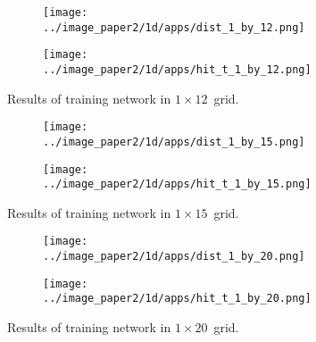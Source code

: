 {    \begin{figure}
        \begin{subfigure}[b]{0.5\textwidth}
            \centering
            \texttt{[image: ../image\_paper2/1d/apps/dist\_1\_by\_12.png]}
        \end{subfigure}
        \hfill
        \begin{subfigure}[b]{0.5\textwidth}
             \texttt{[image: ../image\_paper2/1d/apps/hit\_t\_1\_by\_12.png]}
        \end{subfigure}
                \caption{Results of training network in $1\times12$~grid.}
         \label{fig: 1by12T}
    \end{figure}

    \begin{figure}
        \begin{subfigure}[b]{0.5\textwidth}
            \centering
            \texttt{[image: ../image\_paper2/1d/apps/dist\_1\_by\_15.png]}
        \end{subfigure}
        \hfill
        \begin{subfigure}[b]{0.5\textwidth}
             \texttt{[image: ../image\_paper2/1d/apps/hit\_t\_1\_by\_15.png]}
        \end{subfigure}
                \caption{Results of training network in $1\times15$~grid.}
         \label{fig: 1by15T}
    \end{figure}

    \begin{figure}
        \begin{subfigure}[b]{0.5\textwidth}
            \centering
            \texttt{[image: ../image\_paper2/1d/apps/dist\_1\_by\_20.png]}
        \end{subfigure}
        \hfill
        \begin{subfigure}[b]{0.5\textwidth}
             \texttt{[image: ../image\_paper2/1d/apps/hit\_t\_1\_by\_20.png]}
        \end{subfigure}
                \caption{Results of training network in $1\times20$~grid.}
         \label{fig: 1by20T}
    \end{figure}
    }
    


